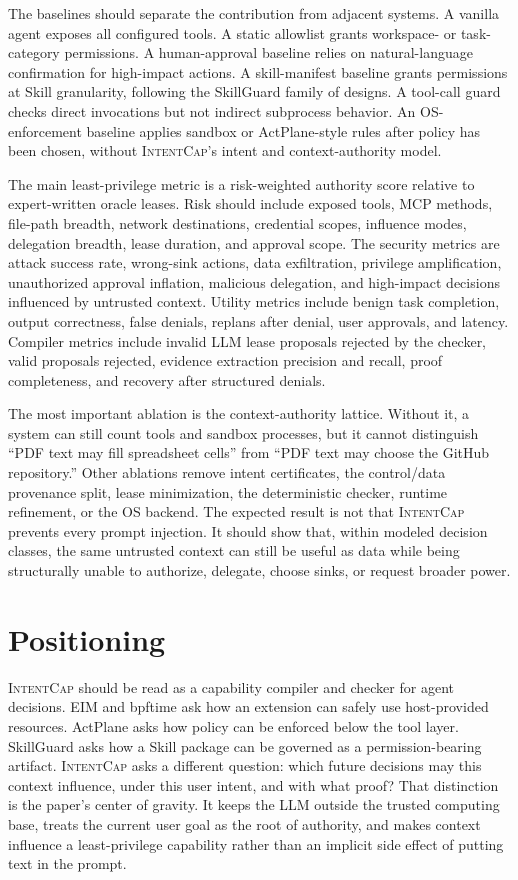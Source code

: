 \documentclass[sigconf,nonacm]{acmart}
\newcommand{\sys}{\textsc{IntentCap}\xspace}
\begin{document}
The baselines should separate the contribution from adjacent systems. A vanilla agent exposes all configured tools. A static allowlist grants workspace- or task-category permissions. A human-approval baseline relies on natural-language confirmation for high-impact actions. A skill-manifest baseline grants permissions at Skill granularity, following the SkillGuard family of designs. A tool-call guard checks direct invocations but not indirect subprocess behavior. An OS-enforcement baseline applies sandbox or ActPlane-style rules after policy has been chosen, without \sys's intent and context-authority model.

The main least-privilege metric is a risk-weighted authority score relative to expert-written oracle leases. Risk should include exposed tools, MCP methods, file-path breadth, network destinations, credential scopes, influence modes, delegation breadth, lease duration, and approval scope. The security metrics are attack success rate, wrong-sink actions, data exfiltration, privilege amplification, unauthorized approval inflation, malicious delegation, and high-impact decisions influenced by untrusted context. Utility metrics include benign task completion, output correctness, false denials, replans after denial, user approvals, and latency. Compiler metrics include invalid LLM lease proposals rejected by the checker, valid proposals rejected, evidence extraction precision and recall, proof completeness, and recovery after structured denials.

The most important ablation is the context-authority lattice. Without it, a system can still count tools and sandbox processes, but it cannot distinguish ``PDF text may fill spreadsheet cells'' from ``PDF text may choose the GitHub repository.'' Other ablations remove intent certificates, the control/data provenance split, lease minimization, the deterministic checker, runtime refinement, or the OS backend. The expected result is not that \sys prevents every prompt injection. It should show that, within modeled decision classes, the same untrusted context can still be useful as data while being structurally unable to authorize, delegate, choose sinks, or request broader power.

\section{Positioning}

\sys should be read as a capability compiler and checker for agent decisions. EIM and bpftime ask how an extension can safely use host-provided resources. ActPlane asks how policy can be enforced below the tool layer. SkillGuard asks how a Skill package can be governed as a permission-bearing artifact. \sys asks a different question: which future decisions may this context influence, under this user intent, and with what proof? That distinction is the paper's center of gravity. It keeps the LLM outside the trusted computing base, treats the current user goal as the root of authority, and makes context influence a least-privilege capability rather than an implicit side effect of putting text in the prompt.



\end{document}
